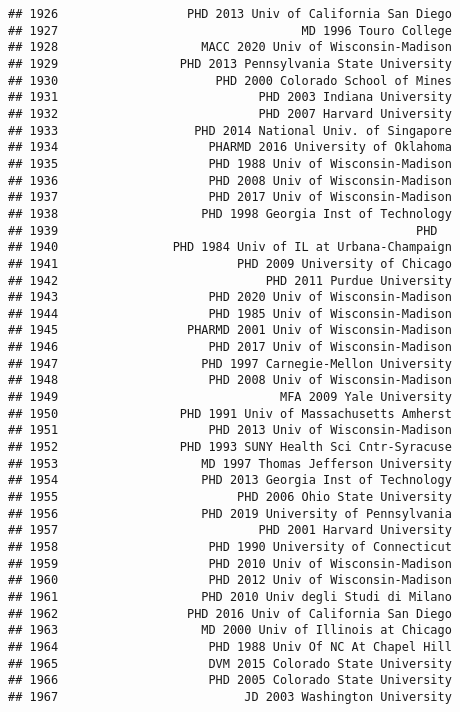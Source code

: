 \documentclass[
]{article}
\begin{document}
\begin{verbatim}
## 1926                  PHD 2013 Univ of California San Diego
## 1927                                  MD 1996 Touro College
## 1928                    MACC 2020 Univ of Wisconsin-Madison
## 1929                 PHD 2013 Pennsylvania State University
## 1930                      PHD 2000 Colorado School of Mines
## 1931                            PHD 2003 Indiana University
## 1932                            PHD 2007 Harvard University
## 1933                   PHD 2014 National Univ. of Singapore
## 1934                     PHARMD 2016 University of Oklahoma
## 1935                     PHD 1988 Univ of Wisconsin-Madison
## 1936                     PHD 2008 Univ of Wisconsin-Madison
## 1937                     PHD 2017 Univ of Wisconsin-Madison
## 1938                    PHD 1998 Georgia Inst of Technology
## 1939                                                  PHD  
## 1940                PHD 1984 Univ of IL at Urbana-Champaign
## 1941                         PHD 2009 University of Chicago
## 1942                             PHD 2011 Purdue University
## 1943                     PHD 2020 Univ of Wisconsin-Madison
## 1944                     PHD 1985 Univ of Wisconsin-Madison
## 1945                  PHARMD 2001 Univ of Wisconsin-Madison
## 1946                     PHD 2017 Univ of Wisconsin-Madison
## 1947                    PHD 1997 Carnegie-Mellon University
## 1948                     PHD 2008 Univ of Wisconsin-Madison
## 1949                               MFA 2009 Yale University
## 1950                 PHD 1991 Univ of Massachusetts Amherst
## 1951                     PHD 2013 Univ of Wisconsin-Madison
## 1952                 PHD 1993 SUNY Health Sci Cntr-Syracuse
## 1953                    MD 1997 Thomas Jefferson University
## 1954                    PHD 2013 Georgia Inst of Technology
## 1955                         PHD 2006 Ohio State University
## 1956                    PHD 2019 University of Pennsylvania
## 1957                            PHD 2001 Harvard University
## 1958                     PHD 1990 University of Connecticut
## 1959                     PHD 2010 Univ of Wisconsin-Madison
## 1960                     PHD 2012 Univ of Wisconsin-Madison
## 1961                    PHD 2010 Univ degli Studi di Milano
## 1962                  PHD 2016 Univ of California San Diego
## 1963                    MD 2000 Univ of Illinois at Chicago
## 1964                     PHD 1988 Univ Of NC At Chapel Hill
## 1965                     DVM 2015 Colorado State University
## 1966                     PHD 2005 Colorado State University
## 1967                          JD 2003 Washington University

\end{verbatim}
\end{document}
